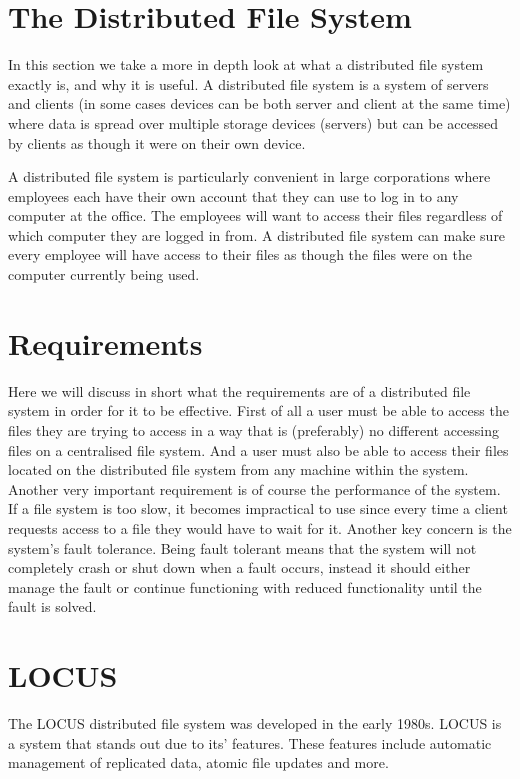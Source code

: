 \documentclass[a4paper,12px]{article}
\begin{document}
\section{The Distributed File System}

In this section we take a more in depth look at what a distributed file system
exactly is, and why it is useful. A distributed file system is a system of
servers and clients (in some cases devices can be both server and client at the
same time) where data is spread over multiple storage devices (servers) but can
be accessed by clients as though it were on their own device.\cite{concepts}

A distributed file system is particularly convenient in large corporations where
employees each have their own account that they can use to log in to any
computer at the office. The employees will want to access their files regardless
of which computer they are logged in from. A distributed file system can make
sure every employee will have access to their files as though the files were on
the computer currently being used.

\section{Requirements}

Here we will discuss in short what the requirements are of a distributed file
system in order for it to be effective. First of all a user must be able to
access the files they are trying to access in a way that is (preferably) no
different accessing files on a centralised file system. And a user must also be
able to access their files located on the distributed file system from any
machine within the system.\cite{concepts} Another very important requirement is
of course the performance of the system. If a file system is too slow, it
becomes impractical to use since every time a client requests access to a file
they would have to wait for it. Another key concern is the system's fault
tolerance. Being fault tolerant means that the system will not completely crash
or shut down when a fault occurs, instead it should either manage the fault or
continue functioning with reduced functionality until the fault is
solved.\cite{concepts}

\section{LOCUS}

The LOCUS distributed file system was developed in the early 1980s. LOCUS is a
system that stands out due to its' features. These features include automatic
management of replicated data, atomic file updates and more. \cite{concepts}
\end{document}
